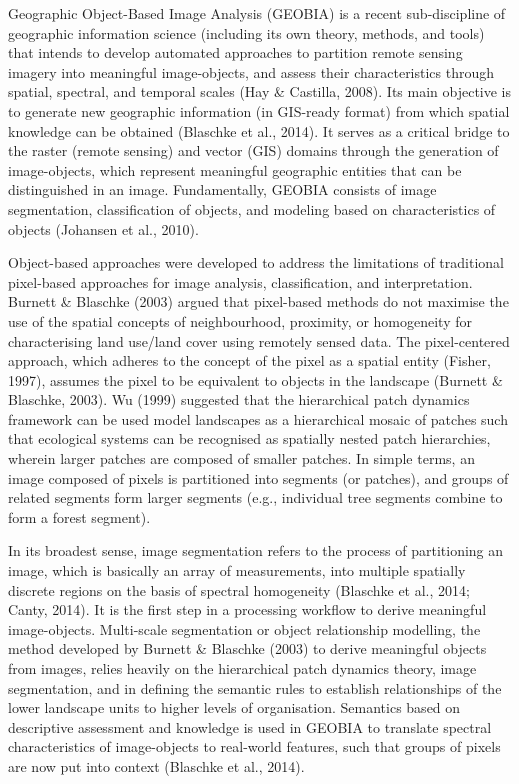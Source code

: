 Geographic Object-Based Image Analysis (GEOBIA) is a recent sub-discipline of geographic information science (including its own theory, methods, and tools) that intends to develop automated approaches to partition remote sensing imagery into meaningful image-objects, and assess their characteristics through spatial, spectral, and temporal scales (Hay \& Castilla, 2008). Its main objective is to generate new geographic information (in GIS-ready format) from which spatial knowledge can be obtained (Blaschke et al., 2014). It serves as a critical bridge to the raster (remote sensing) and vector (GIS) domains through the generation of image-objects, which represent meaningful geographic entities that can be distinguished in an image. Fundamentally, GEOBIA consists of image segmentation, classification of objects, and modeling based on characteristics of objects (Johansen et al., 2010).

Object-based approaches were developed to address the limitations of traditional pixel-based approaches for image analysis, classification, and interpretation. Burnett \& Blaschke (2003) argued that pixel-based methods do not maximise the use of the spatial concepts of neighbourhood, proximity, or homogeneity for characterising land use/land cover using remotely sensed data. The pixel-centered approach, which adheres to the concept of the pixel as a spatial entity (Fisher, 1997), assumes the pixel to be equivalent to objects in the landscape (Burnett \& Blaschke, 2003). Wu (1999) suggested that the hierarchical patch dynamics framework can be used model landscapes as a hierarchical mosaic of patches such that ecological systems can be recognised as spatially nested patch hierarchies, wherein larger patches are composed of smaller patches. In simple terms, an image composed of pixels is partitioned into segments (or patches), and groups of related segments form larger segments (e.g., individual tree segments combine to form a forest segment).

In its broadest sense, image segmentation refers to the process of partitioning an image, which is basically an array of measurements, into multiple spatially discrete regions on the basis of spectral homogeneity (Blaschke et al., 2014; Canty, 2014). It is the first step in a processing workflow to derive meaningful image-objects. Multi-scale segmentation or object relationship modelling, the method developed by Burnett \& Blaschke (2003) to derive meaningful objects from images, relies heavily on the hierarchical patch dynamics theory, image segmentation, and in defining the semantic rules to establish relationships of the lower landscape units to higher levels of organisation. Semantics based on descriptive assessment and knowledge is used in GEOBIA to translate spectral characteristics of image-objects to real-world features, such that groups of pixels are now put into context (Blaschke et al., 2014).

